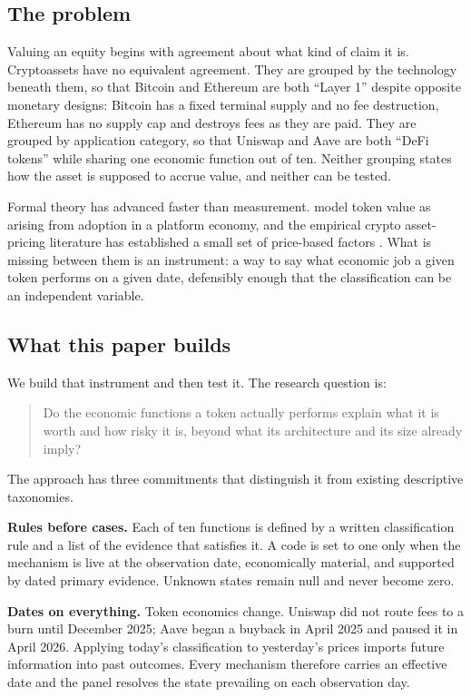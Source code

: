 \documentclass[10pt]{article}
\begin{document}
\subsection{The problem}
Valuing an equity begins with agreement about what kind of claim it is. Cryptoassets have no equivalent agreement. They are grouped by the technology beneath them, so that Bitcoin and Ethereum are both ``Layer 1'' despite opposite monetary designs: Bitcoin has a fixed terminal supply and no fee destruction, Ethereum has no supply cap and destroys fees as they are paid. They are grouped by application category, so that Uniswap and Aave are both ``DeFi tokens'' while sharing one economic function out of ten. Neither grouping states how the asset is supposed to accrue value, and neither can be tested.

Formal theory has advanced faster than measurement. \citet{congliwang2021tokenomics} model token value as arising from adoption in a platform economy, and the empirical crypto asset-pricing literature has established a small set of price-based factors \citep{liutsyvinski2021risks,liutsyvinskiwu2022common}. What is missing between them is an instrument: a way to say what economic job a given token performs on a given date, defensibly enough that the classification can be an independent variable.

\subsection{What this paper builds}
We build that instrument and then test it. The research question is:

\begin{quote}
Do the economic functions a token actually performs explain what it is worth and how risky it is, beyond what its architecture and its size already imply?
\end{quote}

The approach has three commitments that distinguish it from existing descriptive taxonomies.

\textbf{Rules before cases.} Each of ten functions is defined by a written classification rule and a list of the evidence that satisfies it. A code is set to one only when the mechanism is live at the observation date, economically material, and supported by dated primary evidence. Unknown states remain null and never become zero.

\textbf{Dates on everything.} Token economics change. Uniswap did not route fees to a burn until December 2025; Aave began a buyback in April 2025 and paused it in April 2026. Applying today's classification to yesterday's prices imports future information into past outcomes. Every mechanism therefore carries an effective date and the panel resolves the state prevailing on each observation day.
\end{document}
